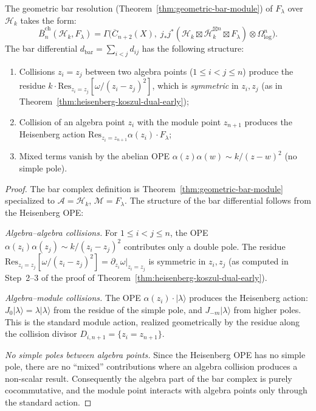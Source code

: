 \begin{proposition}
\label{prop:fock-bar-resolution}
The geometric bar resolution
(Theorem~\ref{thm:geometric-bar-module}) of $F_\lambda$ over
$\mathcal{H}_k$ takes the form:
\begin{equation}\label{eq:fock-bar-resolution}
\overline{B}_n^{\mathrm{ch}}(\mathcal{H}_k, F_\lambda)
= \Gamma\bigl(\overline{C}_{n+2}(X),\;
j_*j^*(\mathcal{H}_k \boxtimes \overline{\mathcal{H}}_k^{\boxtimes n}
\boxtimes F_\lambda) \otimes \Omega^n_{\log}\bigr).
\end{equation}
The bar differential $d_{\mathrm{bar}} = \sum_{i<j} d_{ij}$ has the
following structure:
\begin{enumerate}[label=\textup{(\roman*)}]
\item Collisions $z_i = z_j$ between two algebra points
 ($1 \leq i < j \leq n$) produce the residue
 $k \cdot \mathrm{Res}_{z_i = z_j}[\omega/(z_i - z_j)^2]$,
 which is \emph{symmetric} in $z_i, z_j$ (as in
 Theorem~\textup{\ref{thm:heisenberg-koszul-dual-early})};
\item Collision of an algebra point $z_i$ with the module point
 $z_{n+1}$ produces the Heisenberg action
 $\mathrm{Res}_{z_i = z_{n+1}} \alpha(z_i) \cdot F_\lambda$;
\item Mixed terms vanish by the abelian OPE
 $\alpha(z)\alpha(w) \sim k/(z-w)^2$ (no simple pole).
\end{enumerate}
\end{proposition}

\begin{proof}
The bar complex definition is Theorem~\ref{thm:geometric-bar-module}
specialized to $\mathcal{A} = \mathcal{H}_k$,
$\mathcal{M} = F_\lambda$. The structure of the bar differential
follows from the Heisenberg OPE:

\emph{Algebra--algebra collisions.} For $1 \leq i < j \leq n$, the OPE
$\alpha(z_i)\alpha(z_j) \sim k/(z_i - z_j)^2$ contributes only a double pole.
The residue $\mathrm{Res}_{z_i = z_j}[\omega/(z_i - z_j)^2]
= \partial_{z_i}\omega|_{z_i = z_j}$ is symmetric in $z_i, z_j$
(as computed in Step~2--3 of the proof of
Theorem~\ref{thm:heisenberg-koszul-dual-early}).

\emph{Algebra--module collisions.} The OPE
$\alpha(z_i) \cdot |\lambda\rangle$ produces the Heisenberg action:
$J_0|\lambda\rangle = \lambda|\lambda\rangle$ from the
residue of the simple pole, and $J_{-m}|\lambda\rangle$
from higher poles. This is the standard module action,
realized geometrically by the residue along the collision divisor
$D_{i,n+1} = \{z_i = z_{n+1}\}$.

\emph{No simple poles between algebra points.} Since the Heisenberg OPE
has no simple pole, there are no ``mixed'' contributions where an
algebra collision produces a non-scalar result. Consequently the algebra part of the bar complex is purely
cocommutative, and the module point interacts with algebra points
only through the standard action.
\end{proof}

